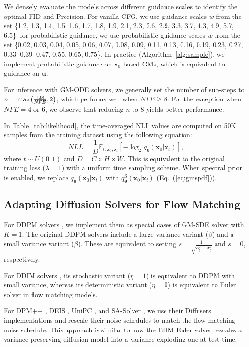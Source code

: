 \documentclass{article}
\def\vtheta{{\bm{\theta}}}
\def\vu{{\bm{u}}}
\def\vx{{\bm{x}}}
\newcommand{\E}{\mathbb{E}}
\theoremstyle{custom}
\theoremstyle{definition}
\theoremstyle{remark}
\let\originalleft\left
\let\originalright\right
\renewcommand{\left}{\mathopen{}\mathclose\bgroup\originalleft}
\renewcommand{\right}{\aftergroup\egroup\originalright}
\begin{document}
We densely evaluate the models across different guidance scales to identify the optimal FID and Precision. For vanilla CFG, we use guidance scales $w$ from the set \{1.2, 1.3, 1.4, 1.5, 1.6, 1.7, 1.8, 1.9, 2.1, 2.3, 2.6, 2.9, 3.3, 3.7, 4.3, 4.9, 5.7, 6.5\}; for probabilistic guidance, we use probabilistic guidance scales $\tilde{w}$ from the set \{0.02, 0.03, 0.04, 0.05, 0.06, 0.07, 0.08, 0.09, 0.11, 0.13, 0.16, 0.19, 0.23, 0.27, 0.33, 0.39, 0.47, 0.55, 0.65, 0.75\}. In practice (Algorithm~\ref{alg:sample}), we implement probabilistic guidance on $\vx_0$-based GMs, which is equivalent to guidance on $\vu$.

For inference with GM-ODE solvers, we generally set the number of sub-steps to $n=\max\left(\frac{128}{\mathit{NFE}}, 2\right)$, which performs well when $\mathit{NFE}\ge 8$. For the exception when $\mathit{NFE}=4$ or $6$, we observe that reducing $n$ to $8$ yields better performance.

In Table~\ref{tab:likelihood}, the time-averaged NLL values are computed on 50K samples from the training dataset using the following equation:
\begin{equation}
    \mathit{NLL} = \frac{1}{D} \E_{t,\vx_0,\vx_t}[-\log_2 q_{\vtheta}(\vx_0 | \vx_t)],
\end{equation}
where $t\sim U(0, 1)$ and $D=C\times H\times W$. This is equivalent to the original training loss ($\lambda=1$) with a uniform time sampling scheme. When spectral prior is enabled, we replace $q_{\vtheta}(\vx_0 | \vx_t)$ with $q^\text{S}_{\vtheta}(\vx_0 | \vx_t)$ (Eq.~(\ref{eq:gmspdf})).

\subsection{Adapting Diffusion Solvers for Flow Matching}
\label{sec:solver_adapt}

For DDPM solvers \cite{ddpm}, we implement them as special cases of GM-SDE solver with $K=1$. The original DDPM solvers include a large variance variant ($\beta$) and a small variance variant ($\tilde{\beta}$). These are equivalent to setting $s=\frac{1}{\sqrt{\alpha_t^2 + \sigma_t^2}}$ and $s=0$, respectively.

For DDIM solvers \cite{ddim}, its stochastic variant ($\eta=1$) is equivalent to DDPM with small variance, whereas its deterministic variant ($\eta=0$) is equivalent to Euler solver in flow matching models.

For DPM++ \cite{dpmpp}, DEIS \cite{deis}, UniPC \cite{unipc}, and SA-Solver \cite{sasolver}, we use their Diffusers implementations \cite{diffusers} and rescale their noise schedules to match the flow matching noise schedule. This approach is similar to how the EDM Euler solver \cite{Karras2022edm} rescales a variance-preserving diffusion model into a variance-exploding one at test time.
\end{document}

